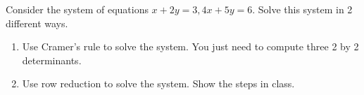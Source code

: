 \begin{theorem}

\end{theorem}


\begin{problem}
 Consider the system of equations $x+2y=3, 4x+5y=6$. Solve this system in 2 different ways.
\begin{enumerate}
 \item Use Cramer's rule to solve the system. You just need to compute three 2 by 2 determinants.
 \item Use row reduction to solve the system. Show the steps in class. 
\end{enumerate}
\end{problem}

